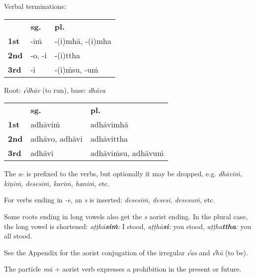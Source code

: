 \documentclass[11pt,oneside]{memoir}
\begin{document}
{\centering\par
\begin{multicols}{2}

Verbal terminations:

\begin{center}
\begin{tabular}{lll}
 & \textbf{sg.} & \textbf{pl.}\\[0pt]
\textbf{1st} & -iṁ & -(i)mhā, -(i)mha\\[0pt]
\textbf{2nd} & -o, -i & -(i)ttha\\[0pt]
\textbf{3rd} & -i & -(i)ṁsu, -uṁ\\[0pt]
\end{tabular}
\end{center}

\columnbreak

Root: \emph{√dhāv} (to run), base: \emph{dhāva}

\begin{center}
\begin{tabular}{lll}
 & \textbf{sg.} & \textbf{pl.}\\[0pt]
\textbf{1st} & adhāviṁ & adhāvimhā\\[0pt]
\textbf{2nd} & adhāvo, adhāvi & adhāvittha\\[0pt]
\textbf{3rd} & adhāvi & adhāviṁsu, adhāvuṁ\\[0pt]
\end{tabular}
\end{center}

\end{multicols}
\par}

The \emph{a-} is prefixed to the verbs, but optionally it may be dropped, e.g.
\emph{dhāviṁ, kiṇiṁ, desesiṁ, kariṁ, haniṁ,} etc.

For verbs ending in \emph{-e}, an \emph{s} is inserted: \emph{desesiṁ, desesi, desesuṁ,} etc.

Some roots ending in long vowels also get the \emph{s} aorist ending. In the plural case, the long vowel is shortened:
\emph{aṭṭhā\textbf{siṁ}:} I stood, \emph{aṭṭhā\textbf{si}:} you stood, \emph{aṭṭha\textbf{ttha}:} you all stood.

See the Appendix for the aorist conjugation of the irregular \emph{√as} and \emph{√hū} (to be).

The particle \emph{mā} + aorist verb expresses a prohibition in the present or future.

\renewcommand{\arraystretch}{1.8}
\end{document}
